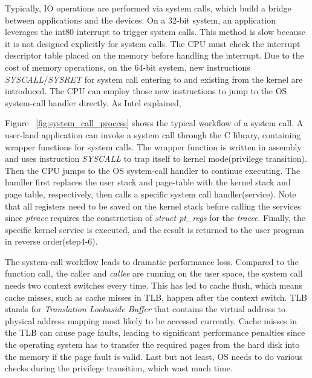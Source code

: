 Typically, IO operations are performed via system calls, 
which build a bridge between applications and the devices.  
 On a 32-bit system, an application leverages the int80 
interrupt to trigger system calls. This method is slow because it is not designed explicitly for system calls. 
The CPU must check the interrupt descriptor table placed on the memory before handling the interrupt. Due to
 the cost of memory operations, on the 64-bit system, new instructions \emph{SYSCALL}/\emph{SYSRET} for system 
 call entering to and existing from the kernel are introduced. The CPU can employ those new instructions to jump 
 to the OS system-call handler directly. As Intel explained, 

Figure ~\ref{fig:system_call_process} shows the typical workflow of a system call. 
A user-land application can invoke a system call through
the C library, containing wrapper functions for system calls. 
The wrapper function is written in assembly and uses instruction \emph{SYSCALL} to trap 
itself to kernel mode(privilege transition). Then the CPU jumps to the OS system-call handler to continue executing. 
The handler first replaces the user stack and page-table with the kernel 
stack and page table, respectively, then calls a specific system call handler(service). 
Note that all registers need to be saved on the kernel stack before calling the services since \emph{ptrace} 
requires the construction of \emph{struct pt\_regs} for the \emph{tracee}. 
Finally, the specific kernel service is executed, and the result is returned 
to the user program in reverse order(step4-6).

The system-call workflow leads to dramatic performance loss. 
Compared to the function call, the caller and \emph{callee} are running on the user space, 
the system call needs two context switches every time. This has led to cache flush, which means
cache misses, such as cache misses in TLB, happen after the context switch.
TLB stands for \emph{Translation Lookaside Buffer} that contains the virtual address to 
physical address mapping most likely to be accessed currently. Cache misses in the TLB can cause page faults, 
leading to significant performance penalties since the operating system has to transfer the required pages 
from the hard disk into the memory if the page fault is valid. Last but not least, OS needs to do various checks 
during the privilege transition, which wast much time.

